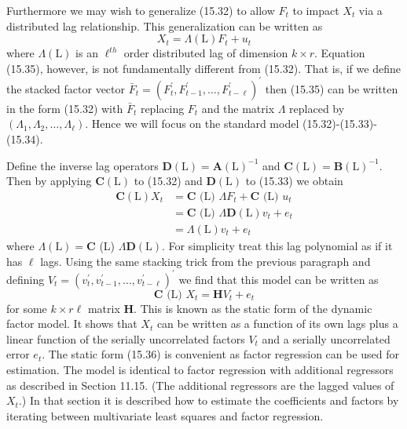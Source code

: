 \documentclass[10pt]{article}
\begin{document}
Furthermore we may wish to generalize (15.32) to allow $F_{t}$ to impact $X_{t}$ via a distributed lag relationship. This generalization can be written as
$$
X_{t}=\Lambda(\mathrm{L}) F_{t}+u_{t}
$$
where $\Lambda(\mathrm{L})$ is an $\ell^{t h}$ order distributed lag of dimension $k \times r$. Equation (15.35), however, is not fundamentally different from (15.32). That is, if we define the stacked factor vector $\bar{F}_{t}=\left(F_{t}^{\prime}, F_{t-1}^{\prime}, \ldots, F_{t-\ell}^{\prime}\right)^{\prime}$ then (15.35) can be written in the form (15.32) with $\bar{F}_{t}$ replacing $F_{t}$ and the matrix $\Lambda$ replaced by $\left(\Lambda_{1}, \Lambda_{2}, \ldots, \Lambda_{\ell}\right)$. Hence we will focus on the standard model (15.32)-(15.33)-(15.34).

Define the inverse lag operators $\boldsymbol{D}(\mathrm{L})=\boldsymbol{A}(\mathrm{L})^{-1}$ and $\boldsymbol{C}(\mathrm{L})=\boldsymbol{B}(\mathrm{L})^{-1}$. Then by applying $\boldsymbol{C}(\mathrm{L})$ to (15.32) and $\boldsymbol{D}(\mathrm{L})$ to (15.33) we obtain
$$
\begin{aligned}
\boldsymbol{C}(\mathrm{L}) X_{t} &=\boldsymbol{C} \text { (L) } \Lambda F_{t}+\boldsymbol{C} \text { (L) } u_{t} \\
&=\boldsymbol{C} \text { (L) } \Lambda \boldsymbol{D}(\mathrm{L}) v_{t}+e_{t} \\
&=\Lambda(\mathrm{L}) v_{t}+e_{t}
\end{aligned}
$$
where $\Lambda(\mathrm{L})=\boldsymbol{C}$ (L) $\Lambda \boldsymbol{D}(\mathrm{L})$. For simplicity treat this lag polynomial as if it has $\ell$ lags. Using the same stacking trick from the previous paragraph and defining $V_{t}=\left(v_{t}^{\prime}, v_{t-1}^{\prime}, \ldots, v_{t-\ell}^{\prime}\right)^{\prime}$ we find that this model can be written as
$$
\boldsymbol{C} \text { (L) } X_{t}=\boldsymbol{H} V_{t}+e_{t}
$$
for some $k \times r \ell$ matrix $\boldsymbol{H}$. This is known as the static form of the dynamic factor model. It shows that $X_{t}$ can be written as a function of its own lags plus a linear function of the serially uncorrelated factors $V_{t}$ and a serially uncorrelated error $e_{t}$. The static form (15.36) is convenient as factor regression can be used for estimation. The model is identical to factor regression with additional regressors as described in Section 11.15. (The additional regressors are the lagged values of $X_{t}$.) In that section it is described how to estimate the coefficients and factors by iterating between multivariate least squares and factor regression.
\end{document}
